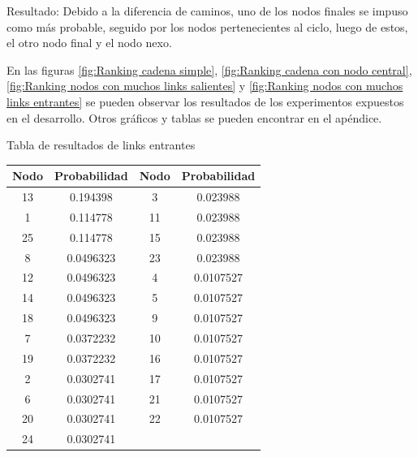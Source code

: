 Resultado: Debido a la diferencia de caminos, uno de los nodos finales se impuso como m\'as probable, seguido por los nodos pertenecientes al ciclo, luego de estos, el otro nodo final y el nodo nexo.


En las figuras \ref{fig:Ranking cadena simple}, \ref{fig:Ranking cadena con nodo central}, \ref{fig:Ranking nodos con muchos links salientes} y \ref{fig:Ranking nodos con muchos links entrantes} se pueden observar los resultados de los experimentos expuestos en el desarrollo.
Otros gráficos y tablas se pueden encontrar en el apéndice.

Tabla de resultados de links entrantes
\begin{table}
	\begin{tabular}{|c|c|c|c|}
		\hline
		Nodo & Probabilidad & Nodo & Probabilidad \\ \hline
		13   & 0.194398     & 3    & 0.023988     \\
		1    & 0.114778     & 11   & 0.023988     \\
		25   & 0.114778     & 15   & 0.023988     \\
		8    & 0.0496323    & 23   & 0.023988     \\
		12   & 0.0496323    & 4    & 0.0107527    \\
		14   & 0.0496323    & 5    & 0.0107527    \\
		18   & 0.0496323    & 9    & 0.0107527    \\
		7    & 0.0372232    & 10   & 0.0107527    \\
		19   & 0.0372232    & 16   & 0.0107527    \\
		2    & 0.0302741    & 17   & 0.0107527    \\
		6    & 0.0302741    & 21   & 0.0107527    \\
		20   & 0.0302741    & 22   & 0.0107527    \\
		24   & 0.0302741    & ~    & ~            \\ \hline
	\end{tabular}
\end{table}


